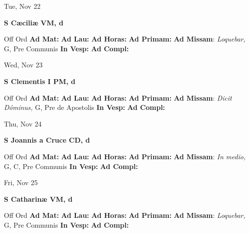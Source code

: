 \documentclass[10pt]{article}
\begin{document}
\begin{minipage}{3.5in}
\vspace{2em}\begin{center}
Tue, Nov 22
\end{center}\textbf{ \large S Cæciliæ VM, \textnormal{\normalsize d}}
\begin{justify}
Off Ord
\textbf{Ad Mat: }
\textbf{Ad Lau: }
\textbf{Ad Horas: }
\textbf{Ad Primam: }
\textbf{Ad Missam}: \textit{Loquebar,} G, Pre Communis
\textbf{In Vesp: }
\textbf{Ad Compl: }\end{justify}
\end{minipage}



\begin{minipage}{3.5in}
\vspace{2em}\begin{center}
Wed, Nov 23
\end{center}\textbf{ \large S Clementis I PM, \textnormal{\normalsize d}}
\begin{justify}
Off Ord
\textbf{Ad Mat: }
\textbf{Ad Lau: }
\textbf{Ad Horas: }
\textbf{Ad Primam: }
\textbf{Ad Missam}: \textit{Dicit Dóminus,} G, Pre de Apostolis
\textbf{In Vesp: }
\textbf{Ad Compl: }\end{justify}
\end{minipage}



\begin{minipage}{3.5in}
\vspace{2em}\begin{center}
Thu, Nov 24
\end{center}\textbf{ \large S Joannis a Cruce CD, \textnormal{\normalsize d}}
\begin{justify}
Off Ord
\textbf{Ad Mat: }
\textbf{Ad Lau: }
\textbf{Ad Horas: }
\textbf{Ad Primam: }
\textbf{Ad Missam}: \textit{In medio,} G, C, Pre Communis
\textbf{In Vesp: }
\textbf{Ad Compl: }\end{justify}
\end{minipage}



\begin{minipage}{3.5in}
\vspace{2em}\begin{center}
Fri, Nov 25
\end{center}\textbf{ \large S Catharinæ VM, \textnormal{\normalsize d}}
\begin{justify}
Off Ord
\textbf{Ad Mat: }
\textbf{Ad Lau: }
\textbf{Ad Horas: }
\textbf{Ad Primam: }
\textbf{Ad Missam}: \textit{Loquebar,} G, Pre Communis
\textbf{In Vesp: }
\textbf{Ad Compl: }\end{justify}
\end{minipage}
\end{document}
